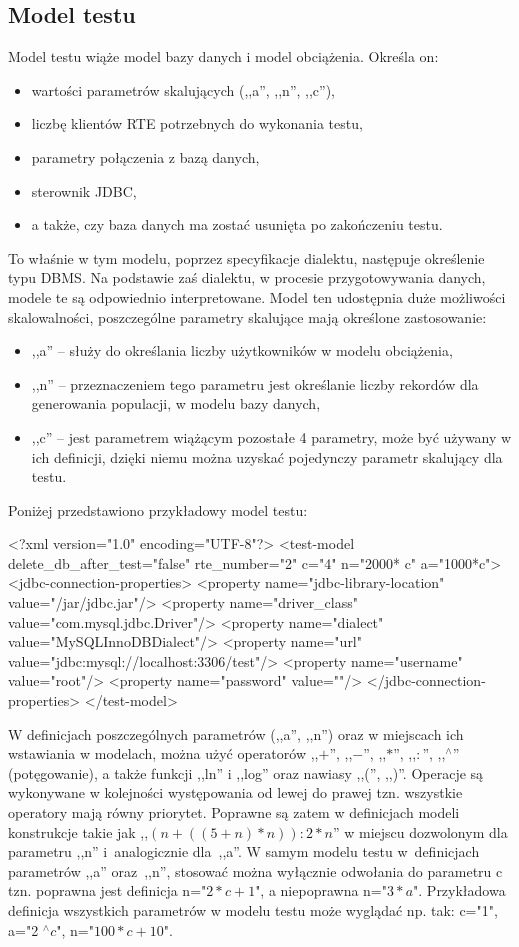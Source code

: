 \subsection{Model testu}\label{sect:testmodel}
Model testu wiąże model bazy danych i model obciążenia. Określa on:
\begin{itemize}
\item wartości parametrów skalujących (,,a'', ,,n'', ,,c''), 
\item liczbę klientów RTE potrzebnych do wykonania testu, 
\item parametry połączenia z bazą danych, 
\item sterownik JDBC, 
\item a także, czy baza danych ma zostać usunięta po zakończeniu testu. 
\end{itemize}

To właśnie w tym modelu, poprzez specyfikacje dialektu, następuje określenie typu DBMS. 
Na podstawie zaś dialektu, w procesie przygotowywania danych, modele te są odpowiednio interpretowane.
Model ten udostępnia duże możliwości skalowalności, poszczególne parametry skalujące
mają określone zastosowanie:
\begin{itemize}
\item ,,a'' -- służy  do określania liczby użytkowników w modelu obciążenia,
\item ,,n'' -- przeznaczeniem tego parametru jest określanie liczby rekordów dla generowania populacji, w modelu bazy danych, 
\item ,,c'' -- jest parametrem wiążącym pozostałe 4 parametry, może być używany w ich definicji,
dzięki niemu można uzyskać pojedynczy parametr skalujący dla testu.
\end{itemize}
Poniżej przedstawiono przykładowy model testu:
\begin{codeblock}
<?xml version="1.0" encoding="UTF-8"?>
<test-model delete_db_after_test="false" rte_number="2" c="4" n="2000* c" a="1000*c">
	<jdbc-connection-properties>
		<property name="jdbc-library-location" value="/jar/jdbc.jar"/>
		<property name="driver_class" value="com.mysql.jdbc.Driver"/>
		<property name="dialect" value="MySQLInnoDBDialect"/>
		<property name="url" value="jdbc:mysql://localhost:3306/test"/>
		<property name="username" value="root"/>
		<property name="password" value=""/>
	</jdbc-connection-properties>
</test-model>
\end{codeblock}

W definicjach poszczególnych parametrów (,,a'', ,,n'') oraz w miejscach ich wstawiania w modelach, można
użyć operatorów ,,$+$'', ,,$-$'', ,,$*$'', ,,$:$'', ,,$^{\wedge}$'' (potęgowanie), a także funkcji ,,ln'' i ,,log'' oraz
nawiasy ,,('', ,,)''. Operacje są wykonywane w kolejności występowania od lewej do prawej tzn.
wszystkie operatory mają równy priorytet. Poprawne są zatem w definicjach modeli konstrukcje takie jak ,,$(n+((5+n)*n)):2*n$''
w miejscu dozwolonym dla parametru ,,n'' i~analogicznie dla~,,a''.
W samym modelu testu w~definicjach parametrów ,,a'' oraz~,,n'',
stosować można wyłącznie odwołania do parametru c tzn. poprawna jest definicja 
n="$2*c+1$", a niepoprawna n="$3*a$". Przykładowa definicja wszystkich parametrów
w modelu testu może wyglądać np. tak: c="1", a="2 $^{\wedge} c$", n="$100 * c + 10$".

